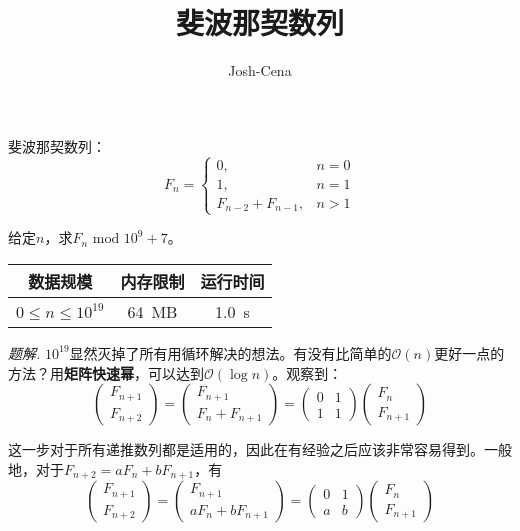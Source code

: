 \documentclass[UTF8,12pt]{ctexart}
\title{斐波那契数列}
\author{Josh-Cena}
\begin{document}
\maketitle
\begin{mdframed}[style=Question]
    斐波那契数列：
    \[F_{n}=
    \begin{cases}
        0,&n=0\\
        1,&n=1\\
        F_{n-2}+F_{n-1},&n>1
    \end{cases}\]

    给定$n$，求$F_{n}\text{ mod }10^9+7$。

    \begin{table}[H]
        \centering
        \begin{tabular}{|c|c|c|}\hline
            数据规模&内存限制&运行时间\\\hline
            $0\le n\le 10^{19}$&\SI{64}{MB}&\SI{1.0}{s}\\\hline
        \end{tabular}
    \end{table}
\end{mdframed}
\textit{题解.} $10^{19}$显然灭掉了所有用循环解决的想法。有没有比简单的$\mathcal{O}(n)$更好一点的方法？用\textbf{矩阵快速幂}，可以达到$\mathcal{O}(\log n)$。观察到：
\[\begin{pmatrix}F_{n+1}\\F_{n+2}\end{pmatrix}=\begin{pmatrix}F_{n+1}\\F_{n}+F_{n+1}\end{pmatrix}=\begin{pmatrix}0&1\\1&1\end{pmatrix}\begin{pmatrix}F_{n}\\F_{n+1}\end{pmatrix}\]

这一步对于所有递推数列都是适用的，因此在有经验之后应该非常容易得到。一般地，对于$F_{n+2}=aF_{n}+bF_{n+1}$，有
\[\begin{pmatrix}F_{n+1}\\F_{n+2}\end{pmatrix}=\begin{pmatrix}F_{n+1}\\aF_{n}+bF_{n+1}\end{pmatrix}=\begin{pmatrix}0&1\\a&b\end{pmatrix}\begin{pmatrix}F_{n}\\F_{n+1}\end{pmatrix}\]
\end{document}
